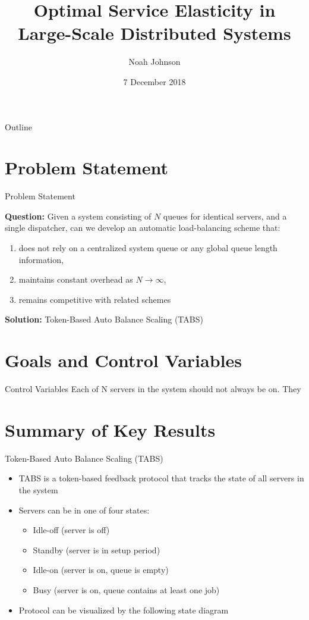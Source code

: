 \documentclass{beamer}
\title[TABS]{Optimal Service Elasticity in Large-Scale Distributed Systems}
\author{Noah Johnson}
\institute{ELE 549 Final Project}
\date{7 December 2018}
\begin{document}
\begin{frame}
	\titlepage
\end{frame}

\begin{frame}{Outline}
	\tableofcontents
\end{frame}

\section{Problem Statement}

\begin{frame}{Problem Statement}

	\textbf{Question:}  Given a system consisting of $N$ queues for identical servers, and a single dispatcher, can we develop an automatic load-balancing scheme that:
	\begin{enumerate}[label=\alph*)]
		\item does not rely on a centralized system queue or any global queue length information,
		\item maintains constant overhead as $N \rightarrow \infty$,
		\item remains competitive with related schemes
	\end{enumerate}
	\textbf{Solution:} Token-Based Auto Balance Scaling (TABS)
\end{frame}

\section{Goals and Control Variables}

\begin{frame}{Control Variables}
	Each of N servers in the system should not always be on. They
\end{frame}

\section{Summary of Key Results}



\begin{frame}{Token-Based Auto Balance Scaling (TABS)}
	\begin{itemize}
		\item TABS is a token-based feedback protocol that tracks the state of all servers in the system
		\item Servers can be in one of four states:
		      \begin{itemize}
			      \item Idle-off (server is off)
			      \item Standby (server is in setup period)
			      \item Idle-on (server is on, queue is empty)
			      \item Busy (server is on, queue contains at least one job)
		      \end{itemize}
		\item Protocol can be visualized by the following state diagram
	\end{itemize}
\end{frame}
\end{document}
